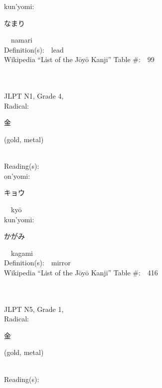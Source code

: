 \begin{multicols}{2}
{\hspace*{1em}}kun'yomi:\ \ \\
{\hspace*{2em}}{\begin{CJK}{UTF8}{min} なまり \end{CJK}}\ \ namari\ \ \\
Definition(s):\ \ lead \\
Wikipedia ``List of the J\=oy\=o Kanji'' Table \#:\ \ 99 \\
\ \ \\
{\fontsize{34pt}{40pt}  }\ \ \\  %
{JLPT N1, Grade 4, \\Radical:\ \ {\begin{CJK}{UTF8}{min} 金 \end{CJK}} (gold, metal) } \\
Reading(s):\ \ \\
{\hspace*{1em}}on'yomi:\ \ \\
{\hspace*{2em}}{\begin{CJK}{UTF8}{min} キョウ \end{CJK}}\ \ ky\=o\ \ \\
{\hspace*{1em}}kun'yomi:\ \ \\
{\hspace*{2em}}{\begin{CJK}{UTF8}{min} かがみ \end{CJK}}\ \ kagami\ \ \\
Definition(s):\ \ mirror \\
Wikipedia ``List of the J\=oy\=o Kanji'' Table \#:\ \ 416 \\
\ \ \\
{\fontsize{34pt}{40pt}  }\ \ \\  %
{JLPT N5, Grade 1, \\Radical:\ \ {\begin{CJK}{UTF8}{min} 金 \end{CJK}} (gold, metal) } \\
Reading(s):\ \ \\

\end{multicols}
